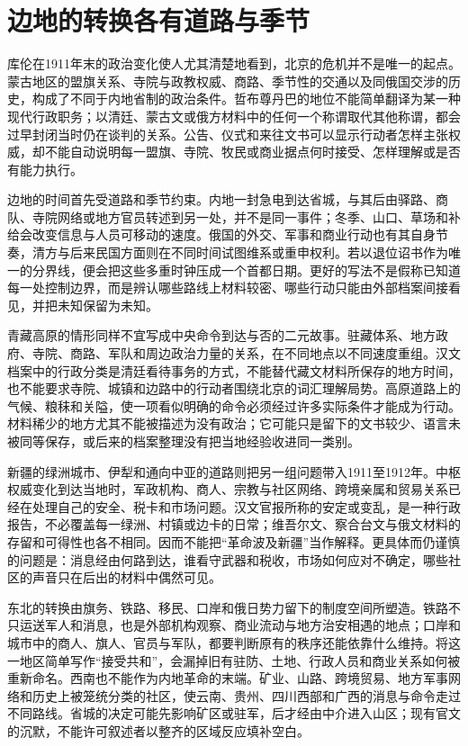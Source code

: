 \section{边地的转换各有道路与季节}

库伦在1911年末的政治变化使人尤其清楚地看到，北京的危机并不是唯一的起点。蒙古地区的盟旗关系、寺院与政教权威、商路、季节性的交通以及同俄国交涉的历史，构成了不同于内地省制的政治条件。哲布尊丹巴的地位不能简单翻译为某一种现代行政职务；以清廷、蒙古文或俄方材料中的任何一个称谓取代其他称谓，都会过早封闭当时仍在谈判的关系。公告、仪式和来往文书可以显示行动者怎样主张权威，却不能自动说明每一盟旗、寺院、牧民或商业据点何时接受、怎样理解或是否有能力执行。

边地的时间首先受道路和季节约束。内地一封急电到达省城，与其后由驿路、商队、寺院网络或地方官员转述到另一处，并不是同一事件；冬季、山口、草场和补给会改变信息与人员可移动的速度。俄国的外交、军事和商业行动也有其自身节奏，清方与后来民国方面则在不同时间试图维系或重申权利。若以退位诏书作为唯一的分界线，便会把这些多重时钟压成一个首都日期。更好的写法不是假称已知道每一处控制边界，而是辨认哪些路线上材料较密、哪些行动只能由外部档案间接看见，并把未知保留为未知。

青藏高原的情形同样不宜写成中央命令到达与否的二元故事。驻藏体系、地方政府、寺院、商路、军队和周边政治力量的关系，在不同地点以不同速度重组。汉文档案中的行政分类是清廷看待事务的方式，不能替代藏文材料所保存的地方时间，也不能要求寺院、城镇和边路中的行动者围绕北京的词汇理解局势。高原道路上的气候、粮秣和关隘，使一项看似明确的命令必须经过许多实际条件才能成为行动。材料稀少的地方尤其不能被描述为没有政治；它可能只是留下的文书较少、语言未被同等保存，或后来的档案整理没有把当地经验收进同一类别。

新疆的绿洲城市、伊犁和通向中亚的道路则把另一组问题带入1911至1912年。中枢权威变化到达当地时，军政机构、商人、宗教与社区网络、跨境亲属和贸易关系已经在处理自己的安全、税卡和市场问题。汉文官报所称的安定或变乱，是一种行政报告，不必覆盖每一绿洲、村镇或边卡的日常；维吾尔文、察合台文与俄文材料的存留和可得性也各不相同。因而不能把“革命波及新疆”当作解释。更具体而仍谨慎的问题是：消息经由何路到达，谁看守武器和税收，市场如何应对不确定，哪些社区的声音只在后出的材料中偶然可见。

东北的转换由旗务、铁路、移民、口岸和俄日势力留下的制度空间所塑造。铁路不只运送军人和消息，也是外部机构观察、商业流动与地方治安相遇的地点；口岸和城市中的商人、旗人、官员与军队，都要判断原有的秩序还能依靠什么维持。将这一地区简单写作“接受共和”，会漏掉旧有驻防、土地、行政人员和商业关系如何被重新命名。西南也不能作为内地革命的末端。矿业、山路、跨境贸易、地方军事网络和历史上被笼统分类的社区，使云南、贵州、四川西部和广西的消息与命令走过不同路线。省城的决定可能先影响矿区或驻军，后才经由中介进入山区；现有官文的沉默，不能许可叙述者以整齐的区域反应填补空白。

